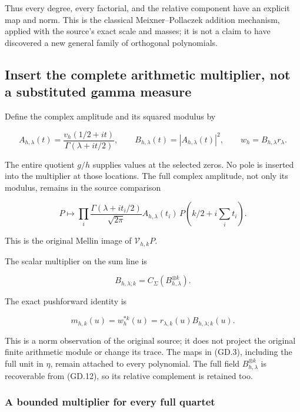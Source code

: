 Thus every degree, every factorial, and the relative component have an
explicit map and norm. This is the classical Meixner--Pollaczek addition
mechanism, applied with the source's exact scale and masses; it is not a
claim to have discovered a new general family of orthogonal polynomials.

\subsection[\hspace{0.4em}Insert the complete arithmetic multiplier, not a substituted
gamma
measure]{Insert the complete arithmetic multiplier, not a substituted
gamma
measure}\label{gammad-insert-the-complete-arithmetic-multiplier-not-a-substituted-gamma-measure}

Define the complex amplitude and its squared modulus by

\[
A_{h,\lambda}(t)
=\frac{v_h(1/2+it)}{\Gamma(\lambda+it/2)},\qquad
B_{h,\lambda}(t)=|A_{h,\lambda}(t)|^2,
\qquad w_h=B_{h,\lambda}r_\lambda.                                 \tag{GD.17}
\]

The entire quotient \(g/h\) supplies values at the selected zeros. No
pole is inserted into the multiplier at those locations. The full
complex amplitude, not only its modulus, remains in the source
comparison

\[
P\longmapsto
\prod_i\frac{\Gamma(\lambda+it_i/2)}{\sqrt{2\pi}}
 A_{h,\lambda}(t_i)\,P(k/2+i\sum_i t_i).
                                                                    \tag{GD.18}
\]

This is the original Mellin image of \(\mathcal V_{h,k}P\).

The scalar multiplier on the sum line is

\[
B_{h,\lambda;k}=C_\Sigma(B_{h,\lambda}^{\otimes k}).
\]

The exact pushforward identity is

\[
\boxed{
 m_{h,k}(u)=w_h^{*k}(u)=r_{\lambda,k}(u)B_{h,\lambda;k}(u).
}                                                                   \tag{GD.19}
\]

This is a norm observation of the original source; it does not project
the original finite arithmetic module or change its trace. The maps in
(GD.3), including the full unit in \(\eta\), remain attached to every
polynomial. The full field \(B_{h,\lambda}^{\otimes k}\) is recoverable
from (GD.12), so its relative complement is retained too.

\subsubsection{A bounded multiplier for every full
quartet}\label{gammad-a-bounded-multiplier-for-every-full-quartet}

